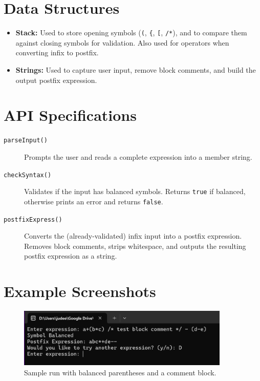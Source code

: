 \documentclass[12pt]{article}
\begin{document}
	\section{Data Structures}
	\begin{itemize}
		\item \textbf{Stack:} Used to store opening symbols (\texttt{(}, \texttt{\{}, \texttt{[}, \texttt{/*}), and to compare them against closing symbols for validation. Also used for operators when converting infix to postfix.
			\item \textbf{Strings:} Used to capture user input, remove block comments, and build the output postfix expression.
		\end{itemize}
		
		\section{API Specifications}
		\begin{description}
			\item[\texttt{parseInput()}] 
			Prompts the user and reads a complete expression into a member string.
			
			\item[\texttt{checkSyntax()}]
			Validates if the input has balanced symbols. Returns \texttt{true} if balanced, otherwise prints an error and returns \texttt{false}.
			
			\item[\texttt{postfixExpress()}]
			Converts the (already-validated) infix input into a postfix expression. Removes block comments, strips whitespace, and outputs the resulting postfix expression as a string.
		\end{description}
		
		\section{Example Screenshots}
		
		\begin{figure}[ht]
			\centering
			\includegraphics[width=0.9\textwidth]{images/Screenshot_2025-02-17_205622.png}
			\caption{Sample run with balanced parentheses and a comment block.}
			\label{fig:run-balanced}
		\end{figure}
		
\end{document}
